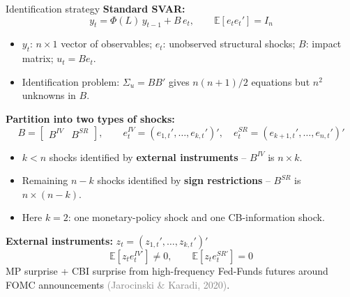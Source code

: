 \documentclass[10pt]{beamer}
\begin{document}
\begin{frame}{Identification strategy}
\textbf{Standard SVAR:}
\begin{equation*}
y_t = \Phi(L)\, y_{t-1} + B\, e_t, \qquad \mathbb{E}[e_t e_t'] = I_n
\end{equation*}
\vspace{-0.6em}
\begin{itemize}\scriptsize
    \item $y_t$: $n\times 1$ vector of observables; $e_t$: unobserved structural shocks; $B$: impact matrix; $u_t = B e_t$.
    \item Identification problem: $\Sigma_u = BB'$ gives $n(n+1)/2$ equations but $n^2$ unknowns in $B$.
\end{itemize}
\pause
\vspace{0.3em}
\textbf{Partition into two types of shocks:}
\begin{equation*}
B = \begin{bmatrix} B^{IV} & B^{SR} \end{bmatrix}, \qquad
e_t^{IV} = (e_{1,t}',\dots,e_{k,t}')', \quad
e_t^{SR} = (e_{k+1,t}',\dots,e_{n,t}')'
\end{equation*}
\vspace{-0.4em}
\begin{itemize}\scriptsize
    \item $k<n$ shocks identified by \textbf{external instruments} -- $B^{IV}$ is $n\times k$.
    \item Remaining $n-k$ shocks identified by \textbf{sign restrictions} -- $B^{SR}$ is $n\times(n-k)$.
    \item Here $k=2$: one monetary-policy shock and one CB-information shock.
\end{itemize}
\pause
\vspace{0.3em}
\textbf{External instruments:} $z_t = (z_{1,t}',\dots,z_{k,t}')'$
\begin{equation*}
\mathbb{E}[z_t e_t^{IV\prime}] \neq 0, \qquad \mathbb{E}[z_t e_t^{SR\prime}] = 0
\end{equation*}
{\scriptsize MP surprise + CBI surprise from high-frequency Fed-Funds futures around FOMC announcements \textcolor{gray}{(Jarocinski \& Karadi, 2020)}.}
\end{frame}
\end{document}
